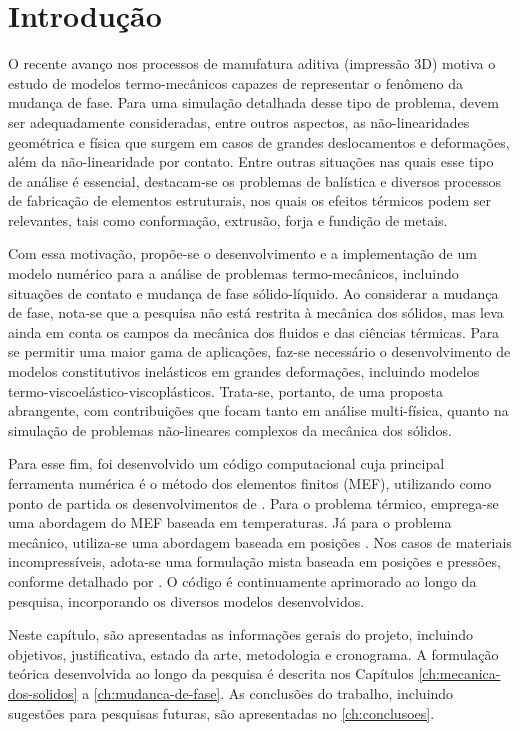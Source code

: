 \documentclass[Tese.tex]{subfiles}
\begin{document}
	
\chapter{Introdução}\label{ch:introducao}

\vfill

O recente avanço nos processos de manufatura aditiva (impressão 3D) motiva o estudo de modelos termo-mecânicos capazes de representar o fenômeno da mudança de fase. Para uma simulação detalhada desse tipo de problema, devem ser adequadamente consideradas, entre outros aspectos, as não-linearidades geométrica e física que surgem em casos de grandes deslocamentos e deformações, além da não-linearidade por contato. Entre outras situações nas quais esse tipo de análise é essencial, destacam-se os problemas de balística e diversos processos de fabricação de elementos estruturais, nos quais os efeitos térmicos podem ser relevantes, tais como conformação, extrusão, forja e fundição de metais.

Com essa motivação, propõe-se o desenvolvimento e a implementação de um modelo numérico para a análise de problemas termo-mecânicos, incluindo situações de contato e mudança de fase sólido-líquido. Ao considerar a mudança de fase, nota-se que a pesquisa não está restrita à mecânica dos sólidos, mas leva ainda em conta os campos da mecânica dos fluidos e das ciências térmicas. Para se permitir uma maior gama de aplicações, faz-se necessário o desenvolvimento de modelos constitutivos inelásticos em grandes deformações, incluindo modelos termo-viscoelástico-viscoplásticos. Trata-se, portanto, de uma proposta abrangente, com contribuições que focam tanto em análise multi-física, quanto na simulação de problemas não-lineares complexos da mecânica dos sólidos.
 
Para esse fim, foi desenvolvido um código computacional cuja principal ferramenta numérica é o método dos elementos finitos (MEF), utilizando como ponto de partida os desenvolvimentos de . Para o problema térmico, emprega-se uma abordagem do MEF baseada em temperaturas. Já para o problema mecânico, utiliza-se uma abordagem baseada em posições \cite{CodaLivro}. Nos casos de materiais incompressíveis, adota-se uma formulação mista baseada em posições e pressões, conforme detalhado por . O código é continuamente aprimorado ao longo da pesquisa, incorporando os diversos modelos desenvolvidos.

Neste capítulo, são apresentadas as informações gerais do projeto, incluindo objetivos, justificativa, estado da arte, metodologia e cronograma. A formulação teórica desenvolvida ao longo da pesquisa é descrita nos Capítulos \ref{ch:mecanica-dos-solidos} a \ref{ch:mudanca-de-fase}. As conclusões do trabalho, incluindo sugestões para pesquisas futuras, são apresentadas no \autoref{ch:conclusoes}.
\end{document}
